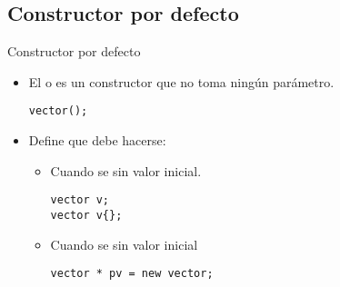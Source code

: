 \subsection{Constructor por defecto}

\begin{frame}[t,fragile]{Constructor por defecto}
\begin{itemize}
  \item El  o  
        es un constructor que no toma ningún parámetro.
\begin{lstlisting}
vector();
\end{lstlisting}

  \item Define que debe hacerse:
    \begin{itemize}
      \item Cuando se  sin valor inicial.
\begin{lstlisting}
vector v;
vector v{};
\end{lstlisting}

      \item Cuando se  sin valor inicial
\begin{lstlisting}
vector * pv = new vector;
\end{lstlisting}

    \end{itemize}
\end{itemize}
\end{frame}

